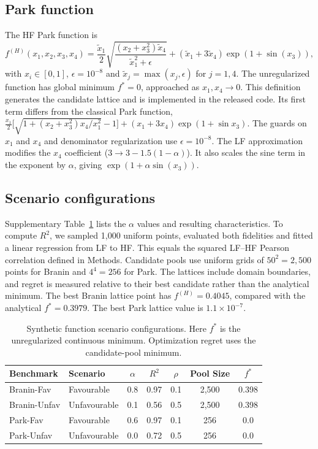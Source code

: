 \subsection{Park function}
The HF Park function is
\begin{equation}
f^{(H)}(x_1, x_2, x_3, x_4) = \frac{\tilde{x}_1}{2}\sqrt{\frac{(x_2 + x_3^2)\tilde{x}_4}{\tilde{x}_1^2 + \epsilon}} + (\tilde{x}_1 + 3\tilde{x}_4)\exp\!\left(1 + \sin(x_3)\right),
\end{equation}
with $x_i \in [0,1]$, $\epsilon = 10^{-8}$ and $\tilde{x}_j = \max(x_j,\epsilon)$ for $j=1,4$. The unregularized function has global minimum $f^* = 0$, approached as $x_1, x_4 \to 0$. This definition generates the candidate lattice and is implemented in the released code. Its first term differs from the classical Park function, $\tfrac{x_1}{2}\bigl[\sqrt{1 + (x_2 + x_3^2)x_4/x_1^2} - 1\bigr] + (x_1 + 3x_4)\exp(1 + \sin x_3)$. The guards on $x_1$ and $x_4$ and denominator regularization use $\epsilon = 10^{-8}$. The LF approximation modifies the $x_4$ coefficient ($3 \rightarrow 3 - 1.5(1-\alpha)$). It also scales the sine term in the exponent by $\alpha$, giving $\exp(1 + \alpha\sin(x_3))$.

\subsection{Scenario configurations}
Supplementary Table~\ref{supptab:synthetic_scenarios} lists the $\alpha$ values and resulting characteristics. To compute $R^2$, we sampled 1,000 uniform points, evaluated both fidelities and fitted a linear regression from LF to HF. This equals the squared LF--HF Pearson correlation defined in Methods. Candidate pools use uniform grids of $50^2 = 2{,}500$ points for Branin and $4^4 = 256$ for Park. The lattices include domain boundaries, and regret is measured relative to their best candidate rather than the analytical minimum. The best Branin lattice point has $f^{(H)} = 0.4045$, compared with the analytical $f^* = 0.3979$. The best Park lattice value is $1.1 \times 10^{-7}$.

\begin{table}[h]
\centering
\caption{Synthetic function scenario configurations. Here $f^*$ is the unregularized continuous minimum. Optimization regret uses the candidate-pool minimum.}
\label{supptab:synthetic_scenarios}
\begin{tabular}{llccccc}
\toprule
\textbf{Benchmark} & \textbf{Scenario} & $\alpha$ & $R^2$ & $\rho$ & \textbf{Pool Size} & $f^*$ \\
\midrule
Branin-Fav & Favourable & 0.8 & 0.97 & 0.1 & 2,500 & 0.398 \\
Branin-Unfav & Unfavourable & 0.1 & 0.56 & 0.5 & 2,500 & 0.398 \\
Park-Fav & Favourable & 0.6 & 0.97 & 0.1 & 256 & 0.0 \\
Park-Unfav & Unfavourable & 0.0 & 0.72 & 0.5 & 256 & 0.0 \\
\bottomrule
\end{tabular}
\end{table}


